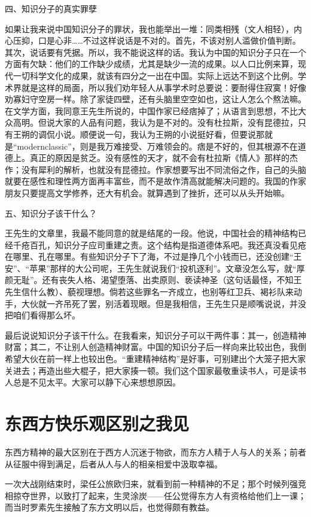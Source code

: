 四、知识分子的真实罪孽 

如果让我来说中国知识分子的罪状，我也能举出一堆：同类相残（文人相轻），内心压抑，口是心非……不过这样说话是不对的。首先，不该对别人滥做价值判断。其次，说话要有凭据。所以，我不能说这样的话。我认为中国的知识分子只在一个方面有欠缺：他们的工作缺少成绩，尤其是缺少一流的成果。以人口比例来算，现代一切科学文化的成果，就该有四分之一出在中国。实际上远达不到这个比例。学术界就是这样的局面，所以我们劝年轻人从事学术时总要说：要耐得住寂寞！好像劝寡妇守空房一样。除了家徒四壁，还有头脑里空空如也，这让人怎么个熬法嘛。在文学方面，我同意王先生所说的，中国作家已经痞掉了；从语言到思想，不比大众高明。但说大家的人品有问题，我认为是不对的。没有杜拉斯，没有昆德拉，只有王朔的调侃小说。顺便说一句，我认为王朔的小说挺好看，但要说那就是“modernclassic”，则是我万难接受、万难领会的。痞是不好的，但其根源不在道德上。真正的原因是贫乏。没有感性的天才，就不会有杜拉斯《情人》那样的杰作；没有犀利的解析，也就没有昆德拉。作家想要写出不同流俗之作，自己的头脑就要在感性和理性两方面再丰富些，而不是故作清高就能解决问题的。我国的作家朋友只要提高文学修养，还大有机会。就算遇到了挫折，还可以从头开始嘛。 

五、知识分子该干什么？ 

王先生的文章里，我最不能同意的就是结尾的一段。他说，中国社会的精神结构已经千疮百孔，知识分子应司重建之责。这个结构是指道德体系吧。我还真没看见疮在哪里、孔在哪里。有些知识分子下了海，不过是挣几个小钱而已，还没创建“王安”、“苹果”那样的大公司呢，王先生就说我们“投机逐利”。文章没怎么写，就“厚颜无耻”。还有丧失人格、渴望堕落、出卖原则、亵读神圣（这句话最怪，不知王先生信什么教）、藐视理想。倘若这些罪名一齐成立，也别等红卫兵、褐衫队来动手，大伙就一齐吊死了罢，别活着现眼。但是我相信，王先生只是顺嘴说说，并没把咱们看得那么坏。 

最后说说知识分子该干什么。在我看来，知识分子可以干两件事：其一，创造精神财富；其二，不让别人创造精神财富。中国的知识分子后一样向来比较出色，我倒希望大伙在前一样上也较出色。“重建精神结构”是好事，可别建出个大笼子把大家关进去；再造出些大棍子，把大家揍一顿。我们这个国家最敬重读书人，可是读书人总是不见太平。大家可以静下心来想想原因。

\chapter{东西方快乐观区别之我见}

东西方精神的最大区别在于西方人沉迷于物欲，而东方人精于人与人的关系；前者从征服中得到满足，后者从人与人的相亲相爱中汲取幸福。 

一次大战刚结束时，梁任公旅欧归来，就看到前一种精神的不足；那个时候列强竞相掠夺世界，以致打了起来，生灵涂炭——任公觉得东方人有资格给他们上一课；而当时罗素先生接触了东方文明以后，也觉得颇有教益。 

